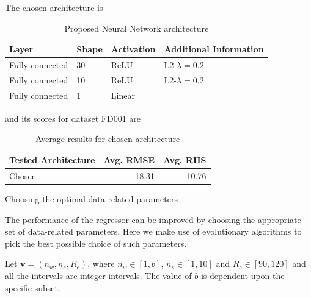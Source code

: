 \documentclass{beamer}
\begin{document}
\begin{darkframes}
     \begin{frame}
     
	The chosen architecture is     
     
     \begin{table}[!htb]
	\centering
		\begin{tabular}{l l l l}
		\hline
		Layer & Shape & Activation & Additional Information\\
  		\hline
  		Fully connected & 30 & ReLU & L2-$\lambda = 0.2$\\
  		Fully connected & 10 & ReLU & L2-$\lambda = 0.2$\\
  		Fully connected & 1 & Linear & \\
  		\hline
	\end{tabular}
	\caption{Proposed Neural Network architecture}
	\label{table:proposed_nn}
	\end{table}
	
	and its scores for dataset FD001 are
	
	\begin{table}[!htb]
	\centering
	\begin{tabular}{l | r | r}
	\hline	
	Tested Architecture & Avg. RMSE  & Avg. RHS \\
  	\hline
  	Chosen & 18.31 & 10.76\\
  	\hline
	\end{tabular}
	\caption{Average results for chosen architecture}
	\label{table:tested_architectures_100}
	\end{table}
      
    \end{frame}
    
    \begin{frame}{Choosing the optimal data-related parameters}
      
	The performance of the regressor can be improved by choosing the appropriate set of data-related parameters. Here we make use of evolutionary algorithms to pick the best possible choice of such parameters. \vspace{1em}
	
	 Let $\mathbf{v} = (n_w, n_s, R_e)$, where $n_w \in \left[1, b\right]$, $n_s \in \left[1, 10\right]$ and $R_e \in \left[90, 120 \right]$ and all the intervals are integer intervals. The value of $b$ is dependent upon the specific subset.      
     
     \end{frame}
     

\end{darkframes}
\end{document}
